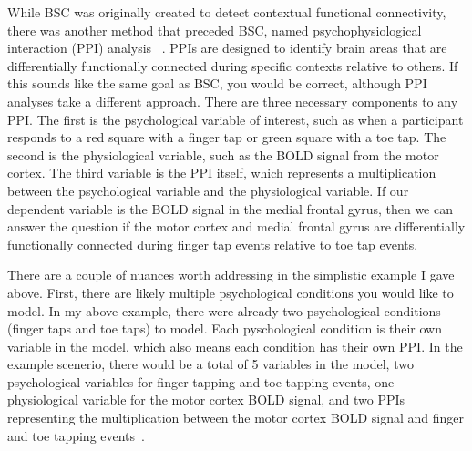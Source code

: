 \documentclass[phd,appendix,figures]{uithesis}
\begin{document}
While BSC was originally created to detect contextual functional connectivity, there was another method
that preceded BSC, named psychophysiological interaction (PPI) analysis ~\cite{Friston1997}. 
PPIs are designed to identify brain areas that are differentially functionally connected
during specific contexts relative to others.
If this sounds like the same goal as BSC, you would be correct, although PPI
analyses take a different approach.
There are three necessary components to any PPI.
The first is the psychological variable of interest, such as when a participant
responds to a red square with a finger tap or green square with a toe tap.
The second is the physiological variable, such as the BOLD signal from
the motor cortex.
The third variable is the PPI itself, which represents a multiplication
between the psychological variable and the physiological variable.
If our dependent variable is the BOLD signal in the medial frontal gyrus,
then we can answer the question if the motor cortex and medial frontal gyrus
are differentially functionally connected during finger tap events relative
to toe tap events.

There are a couple of nuances worth addressing in the simplistic example I gave above.
First, there are likely multiple psychological conditions you would like to model.
In my above example, there were already two psychological conditions (finger taps and toe taps)
to model.
Each pyschological condition is their own variable in the model, which also
means each condition has their own PPI.
In the example scenerio, there would be a total of 5 variables in the model,
two psychological variables for finger tapping and toe tapping events,
one physiological variable for the motor cortex BOLD signal,
and two PPIs representing the multiplication between the motor cortex BOLD signal
and finger and toe tapping events~\cite{McLaren2012}.
\end{document}
